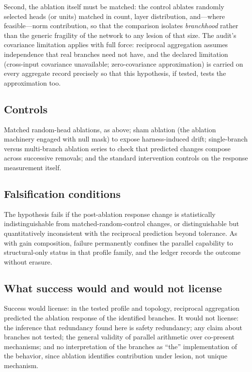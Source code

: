 Second, the ablation itself must be matched: the control ablates randomly selected heads (or units) matched in count, layer distribution, and---where feasible---norm contribution, so that the comparison isolates \emph{branchhood} rather than the generic fragility of the network to any lesion of that size. The audit's covariance limitation applies with full force: reciprocal aggregation assumes independence that real branches need not have, and the declared limitation (cross-input covariance unavailable; zero-covariance approximation) is carried on every aggregate record precisely so that this hypothesis, if tested, tests the approximation too.

\subsection{Controls}

Matched random-head ablations, as above; sham ablation (the ablation machinery engaged with null mask) to expose harness-induced drift; single-branch versus multi-branch ablation series to check that predicted changes compose across successive removals; and the standard intervention controls on the response measurement itself.

\subsection{Falsification conditions}

The hypothesis fails if the post-ablation response change is statistically indistinguishable from matched-random-control changes, or distinguishable but quantitatively inconsistent with the reciprocal prediction beyond tolerance. As with gain composition, failure permanently confines the parallel capability to structural-only status in that profile family, and the ledger records the outcome without erasure.

\subsection{What success would and would not license}

Success would license: in the tested profile and topology, reciprocal aggregation predicted the ablation response of the identified branches. It would not license: the inference that redundancy found here is safety redundancy; any claim about branches not tested; the general validity of parallel arithmetic over co-present mechanisms; and no interpretation of the branches as ``the'' implementation of the behavior, since ablation identifies contribution under lesion, not unique mechanism.

